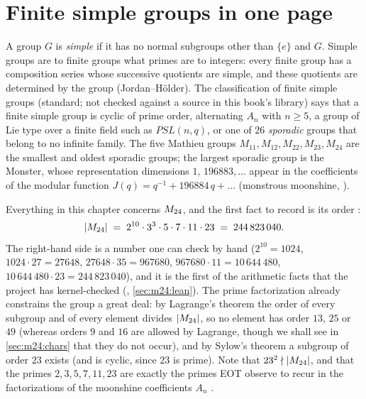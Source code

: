 \section{Finite simple groups in one page}\label{sec:m24:simple}

A group $G$ is \emph{simple} if it has no normal subgroups other than
$\{e\}$ and $G$. Simple groups are to finite groups what primes are to integers: every finite
group has a composition series whose successive quotients are simple, and these quotients are
determined by the group (Jordan--H\"older). The classification of finite simple groups
(standard; not checked against a source in this book's library) says that a finite simple
group is cyclic of prime order, alternating $A_n$ with $n\ge5$, a group of Lie type over a
finite field such as $PSL(n,q)$, or one of $26$ \emph{sporadic} groups
that belong to no infinite family. The five Mathieu groups $M_{11}, M_{12}, M_{22}, M_{23},
M_{24}$ are the smallest and oldest sporadic groups; the largest sporadic group is the
Monster, whose representation dimensions $1,\,196883,\dots$ appear in the coefficients of the
modular function $J(q)=q^{-1}+196884\,q+\dots$ (monstrous moonshine, ).

Everything in this chapter concerns $M_{24}$, and the first fact to record is its order
:
\begin{equation}\label{eq:m24:order}
 |M_{24}| \;=\; 2^{10}\cdot3^3\cdot5\cdot7\cdot11\cdot23 \;=\; 244\,823\,040 .
\end{equation}
The right-hand side is a number one can check by hand ($2^{10}=1024$, $1024\cdot27=27648$,
$27648\cdot35=967680$, $967680\cdot11=10\,644\,480$, $10\,644\,480\cdot23=244\,823\,040$), and
it is the first of the arithmetic facts that the project has kernel-checked
(, \cref{sec:m24:lean}). The prime factorization already constrains the
group a great deal: by Lagrange's theorem the order of every
subgroup and of every element divides $|M_{24}|$, so no element has order $13$, $25$ or $49$
(whereas orders $9$ and $16$ are allowed by Lagrange, though we shall see in
\cref{sec:m24:chars} that they do not occur), and by Sylow's theorem a subgroup of order
$23$ exists (and is cyclic, since $23$ is prime).
Note that $23^2\nmid|M_{24}|$, and that the primes $2,3,5,7,11,23$ are exactly the primes EOT
observe to recur in the factorizations of the moonshine coefficients $A_n$ .

